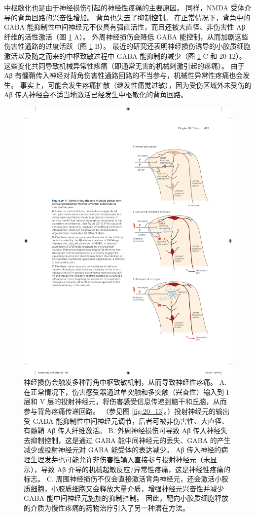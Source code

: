 中枢敏化也是由于神经损伤引起的神经性疼痛的主要原因。 
同样，NMDA 受体介导的背角回路的兴奋性增加。 
背角也失去了抑制控制。 
在正常情况下，背角中的 GABA 能抑制性中间神经元不仅具有强直活性，而且还被大直径、非伤害性 Aβ 纤维的活性激活（图 \ref{fig:20_11} A）。 
外周神经损伤会降低 GABA 能控制，从而加剧这些伤害性通路的过度活跃（图 \ref{fig:20_11} B）。 
最近的研究还表明神经损伤诱导的小胶质细胞激活以及随之而来的中枢致敏过程中 GABA 能抑制的减少（图 \ref{fig:20_11} C 和 20-12）。 
这些变化共同导致机械异常性疼痛（即通常无害的机械刺激引起的疼痛）。 
由于 Aβ 有髓鞘传入神经对背角伤害性通路回路的不当参与，机械性异常性疼痛也会发生。 
事实上，可能会发生疼痛扩散（继发性痛觉过敏），因为受伤区域外未受伤的 Aβ 传入神经会不适当地激活已经发生中枢敏化的背角回路。


\begin{figure}[htbp]
	\centering
	\includegraphics[width=0.5\linewidth]{chap20/fig_20_11}
	\caption{神经损伤会触发多种背角中枢致敏机制，从而导致神经性疼痛。 
		A. 在正常情况下，伤害感受器通过单突触和多突触（兴奋性）输入到 I 层和 V 层的投射神经元，将伤害感受信息传递到脑干和丘脑，从而参与背角疼痛传递回路。 （参见图 \ref{fig:20_13}。）投射神经元的输出受 GABA 能抑制性中间神经元调节，后者可被非伤害性、大直径、有髓鞘 Aβ 传入纤维激活。 
		B. 外周神经损伤可导致 Aβ 传入神经失去抑制控制，这是通过 GABA 能中间神经元的丢失、GABA 的产生减少或投射神经元对 GABA 能受体的表达减少。 
		Aβ 传入神经的病理生理发芽也可能允许非伤害性输入直接参与投射神经元（未显示），导致 Aβ 介导的机械超敏反应/异常性疼痛，这是神经性疼痛的标志。 
		C. 周围神经损伤不仅会直接激活背角神经元，还会激活小胶质细胞，小胶质细胞又会释放大量介质，增强神经元兴奋性并减少 GABA 能中间神经元施加的抑制控制。 因此，靶向小胶质细胞释放的介质为慢性疼痛的药物治疗引入了另一种潜在方法。}
	\label{fig:20_11}
\end{figure}


